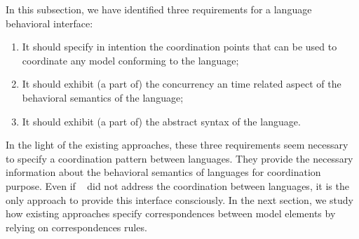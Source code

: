 {In this subsection, we have identified three requirements for a language behavioral interface:
\begin{enumerate}
\item It should specify in intention the coordination points that can be used to coordinate any model conforming to the language;
\item It should exhibit (a part of) the concurrency an time related aspect of the behavioral semantics of the language;
\item It should exhibit (a part of) the abstract syntax of the language.
\end{enumerate}

In the light of the existing approaches, these three requirements seem necessary to specify a coordination pattern between languages. They provide the necessary information about the behavioral semantics of languages for coordination purpose. Even if ~\cite{sle13-combemale} did not address the coordination between languages, it is the only approach to provide this interface consciously. In the next section, we study how existing approaches specify correspondences between model elements by relying on correspondences rules.

	    	
	    	
	    				
	    				
	    				
	    				
}
